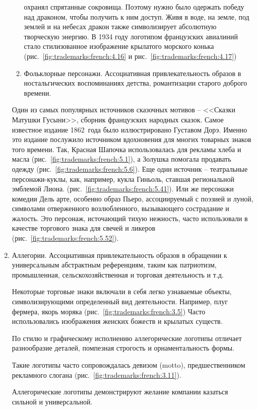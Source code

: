 \begin{enumerate}
\begin{enumerate}
    охранял спрятанные сокровища. Поэтому нужно было одержать победу над
    драконом, чтобы получить к ним доступ. Живя в воде, на земле, под
    землей и на небесах дракон также символизирует абсолютную творческую
    энергию. В 1934 году логотипом французских авиалиний стало стилизованное
    изображение крылатого морского конька (рис.~\ref{fig:trademarks:french:4.16} и рис.~\ref{fig:trademarks:french:4.17})
  \item Фольклорные персонажи. Ассоциативная привлекательность образов в
    ностальгических воспоминаниях детства, романтизации старого доброго
    времени.
  \end{enumerate}
    Один из самых популярных источников сказочных мотивов -- <<Сказки Матушки
    Гусыни>>, сборник французских народных сказок. Самое известное издание 1862~года
    было иллюстрировано Густавом Дорэ. Именно это издание послужило источником
    вдохновения для многих товарных знаков того времени. Так, Красная
    Шапочка использовалась для рекламы хлеба и масла (рис.~\ref{fig:trademarks:french:5.1}), а Золушка
    помогала продавать одежду (рис.~\ref{fig:trademarks:french:5.6}). Еще один источник -- театральные
    персонажи-куклы, как, например, кукла Гиньоль, ставшая региональной
    эмблемой Лиона. (рис.~\ref{fig:trademarks:french:5.41}). Или же персонажи комедии Дель арте, особенно
    образ Пьеро, ассоциируемый с поэзией и луной, символами отверженного
    возлюбленного, вызывающего сострадание и жалость. Это персонаж, источающий
    тихую нежность, часто использовали в качестве торгового знака для свечей
    и ликеров (рис.~\ref{fig:trademarks:french:5.52}).

  \item Аллегории. Ассоциативная привлекательность образов в обращении к универсальным абстрактным
    референциям, таким как патриотизм, промышленная, сельскохозяйственная и торговая
    деятельность и т.д.

    Некоторые торговые знаки включали в себя легко узнаваемые объекты,
    символизирующими определенный вид деятельности. Например, плуг фермера,
    якорь моряка (рис.~\ref{fig:trademarks:french:3.5}) Часто использовались изображения женских божеств и
    крылатых существ.

    По стилю и графическому исполнению аллегорические логотипы отличает разнообразие
    деталей, помпезная строгость и орнаментальность формы. %

    Такие логотипы часто сопровождалась девизом (motto), предшественником
    рекламного слогана (рис.~\ref{fig:trademarks:french:3.11}).

    Аллегорические логотипы демонстрируют желание компании казаться сильной и
    универсальной.
\end{enumerate}

